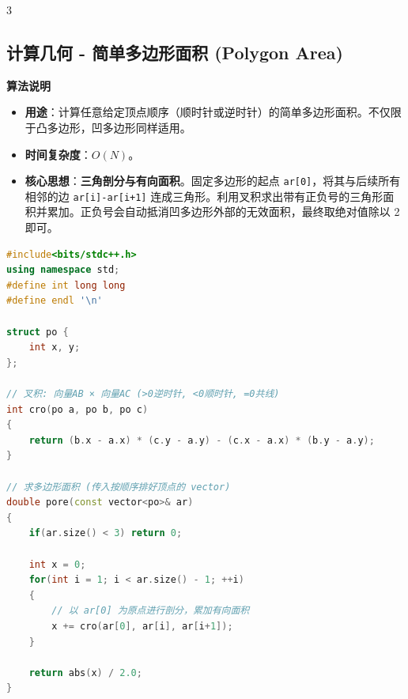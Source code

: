 \documentclass[10pt,landscape,a4paper]{article}
\begin{document}
\begin{multicols*}{3}
\subsection*{计算几何 - 简单多边形面积 (Polygon Area)}
\par\addvspace{0.7ex}\noindent\textbf{算法说明}\par\nobreak
\begin{itemize}
\item \textbf{用途}：计算任意给定顶点顺序（顺时针或逆时针）的简单多边形面积。不仅限于凸多边形，凹多边形同样适用。
\item \textbf{时间复杂度}：$O(N)$。
\item \textbf{核心思想}：\textbf{三角剖分与有向面积}。固定多边形的起点 \texttt{a\allowbreak{}r\allowbreak{}[\allowbreak{}0\allowbreak{}]}，将其与后续所有相邻的边 \texttt{a\allowbreak{}r\allowbreak{}[\allowbreak{}i\allowbreak{}]\allowbreak{}-\allowbreak{}a\allowbreak{}r\allowbreak{}[\allowbreak{}i\allowbreak{}+\allowbreak{}1\allowbreak{}]} 连成三角形。利用叉积求出带有正负号的三角形面积并累加。正负号会自动抵消凹多边形外部的无效面积，最终取绝对值除以 2 即可。
\end{itemize}
\par{}\par
\begin{lstlisting}[language=C++]
#include<bits/stdc++.h>
using namespace std;
#define int long long
#define endl '\n'

struct po {
    int x, y;
};

// 叉积: 向量AB × 向量AC (>0逆时针, <0顺时针, =0共线)
int cro(po a, po b, po c)
{
    return (b.x - a.x) * (c.y - a.y) - (c.x - a.x) * (b.y - a.y);
}

// 求多边形面积 (传入按顺序排好顶点的 vector)
double pore(const vector<po>& ar)
{
    if(ar.size() < 3) return 0;
    
    int x = 0; 
    for(int i = 1; i < ar.size() - 1; ++i)
    {
        // 以 ar[0] 为原点进行剖分，累加有向面积
        x += cro(ar[0], ar[i], ar[i+1]);
    }
    
    return abs(x) / 2.0; 
}
\end{lstlisting}
\end{multicols*}
\end{document}
